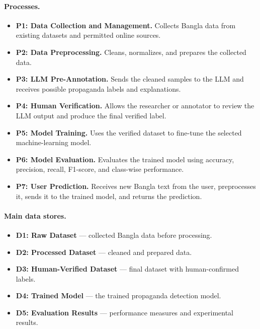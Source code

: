 \documentclass[12pt,a4paper]{report}
\begin{document}
\paragraph{Processes.}
\begin{itemize}
  \item \textbf{P1: Data Collection and Management.} Collects Bangla data from
        existing datasets and permitted online sources.
  \item \textbf{P2: Data Preprocessing.} Cleans, normalizes, and prepares the
        collected data.
  \item \textbf{P3: LLM Pre-Annotation.} Sends the cleaned samples to the LLM and
        receives possible propaganda labels and explanations.
  \item \textbf{P4: Human Verification.} Allows the researcher or annotator to
        review the LLM output and produce the final verified label.
  \item \textbf{P5: Model Training.} Uses the verified dataset to fine-tune the
        selected machine-learning model.
  \item \textbf{P6: Model Evaluation.} Evaluates the trained model using accuracy,
        precision, recall, F1-score, and class-wise performance.
  \item \textbf{P7: User Prediction.} Receives new Bangla text from the user,
        preprocesses it, sends it to the trained model, and returns the prediction.
\end{itemize}

\paragraph{Main data stores.}
\begin{itemize}
  \item \textbf{D1: Raw Dataset} --- collected Bangla data before processing.
  \item \textbf{D2: Processed Dataset} --- cleaned and prepared data.
  \item \textbf{D3: Human-Verified Dataset} --- final dataset with human-confirmed
        labels.
  \item \textbf{D4: Trained Model} --- the trained propaganda detection model.
  \item \textbf{D5: Evaluation Results} --- performance measures and experimental
        results.
\end{itemize}
\end{document}
